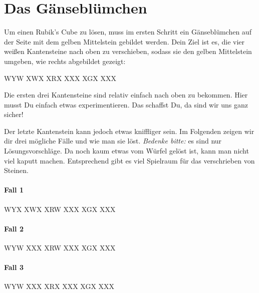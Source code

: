 \section{Das Gänseblümchen}

\parbox{0.7\linewidth}{
  Um einen Rubik's Cube zu lösen, muss im ersten Schritt ein Gänseblümchen auf der Seite mit dem gelben Mittelstein gebildet werden.
  Dein Ziel ist es, die vier weißen Kantensteine nach oben zu verschieben, sodass sie den gelben Mittelstein umgeben, wie rechts abgebildet gezeigt:\\[1em]
} \parbox{0.3\linewidth}{
  \RubikCubeGreyAll%
	      {W}{Y}{W}
	      {X}{W}{X}%
		 {X}{R}{X}
		 {X}{X}{X}%
		 {X}{G}{X}
		 {X}{X}{X}%
  \\[1em]
}

Die ersten drei Kantensteine sind relativ einfach nach oben zu bekommen.
Hier musst Du einfach etwas experimentieren.
Das schaffst Du, da sind wir uns ganz sicher!

Der letzte Kantenstein kann jedoch etwas kniffliger sein.
Im Folgenden zeigen wir dir drei mögliche Fälle und wie man sie löst.
\emph{Bedenke bitte:} es sind nur Lösungsvorschläge.
Da noch kaum etwas vom Würfel gelöst ist, kann man nicht viel kaputt machen.
Entsprechend gibt es viel Spielraum für das verschrieben von Steinen.

\paragraph{Fall 1}
\RubikCubeGreyAll%
            {W}{Y}{X}
            {X}{W}{X}%
               {X}{R}{W}
	       {X}{X}{X}%
	       {X}{G}{X}
	       {X}{X}{X}%
\quad{}

\paragraph{Fall 2}
\RubikCubeGreyAll%
            {W}{Y}{W}
            {X}{X}{X}%
               {X}{R}{W}
	       {X}{X}{X}%
	       {X}{G}{X}
	       {X}{X}{X}%
\quad{}
\quad{}

\paragraph{Fall 3}
\RubikCubeGreyAll%
            {W}{Y}{W}
            {X}{X}{X}%
               {X}{R}{X}
	       {X}{X}{X}%
	       {X}{G}{X}
	       {X}{X}{X}%
\quad{}
\quad{}
\quad{}
